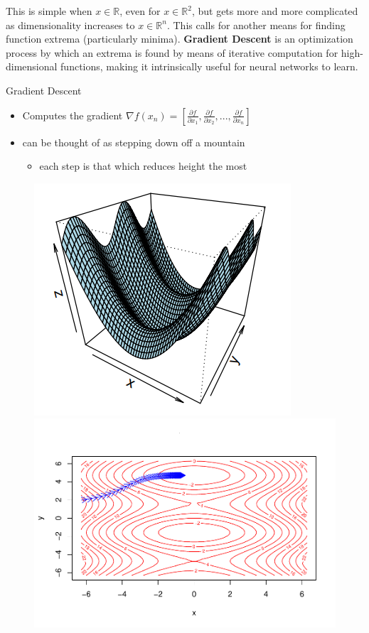 This is simple when \(x \in \mathbb{R}\), even for
\(x \in \mathbb{R}^2\), but gets more  and more complicated as
dimensionality increases to \(x \in \mathbb{R}^n\). This calls for
another means for finding function extrema (particularly minima).
\textbf{Gradient Descent} is an optimization process by which an extrema is found by
means of iterative computation for high-dimensional functions, making it
intrinsically useful for neural networks to learn.

Gradient Descent

\begin{itemize}
\tightlist
\item
  Computes the gradient 
$  
  \nabla f(x_n) =
  \left[ \frac{\partial f}{\partial x_1} , \frac{\partial f}{\partial x_2} , ... , \frac{\partial f}{\partial x_n} \right]
$
  
\item
  can be thought of as stepping down off a mountain

  \begin{itemize}
  \tightlist
  \item
    each step is that which reduces height the most
  \end{itemize}
\end{itemize}



\begin{figure}[H]
    \includegraphics[width = .4\textwidth]{Figures/grad_desc-51.png}
    \includegraphics[width = .6\textwidth]{Figures/grad_desc-50.pdf}
\end{figure}

